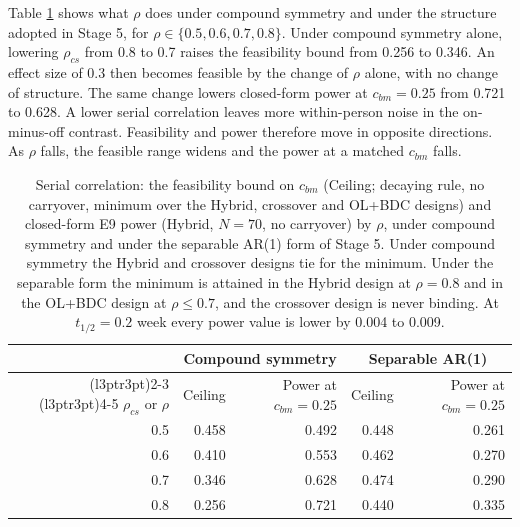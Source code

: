 \documentclass[
  11pt,
]{article}
\begin{document}
Table \ref{tab:rhostage} shows what \(\rho\) does under compound
symmetry and under the structure adopted in Stage 5, for
\(\rho \in \{0.5, 0.6, 0.7, 0.8\}\). Under compound symmetry alone,
lowering \(\rho_{cs}\) from 0.8 to 0.7 raises the feasibility bound from
0.256 to 0.346. An effect size of 0.3 then becomes feasible by the
change of \(\rho\) alone, with no change of structure. The same
change lowers closed-form power at \(c_{bm} = 0.25\) from 0.721 to
0.628. A lower serial correlation leaves more within-person noise in
the on-minus-off contrast. Feasibility and power therefore move in
opposite directions. As \(\rho\) falls, the feasible range widens and
the power at a matched \(c_{bm}\) falls.

\begin{table}

\caption{\label{tab:rhostage}Serial correlation: the feasibility bound on $c_{bm}$ (Ceiling; decaying rule, no carryover, minimum over the Hybrid, crossover and OL+BDC designs) and closed-form E9 power (Hybrid, $N = 70$, no carryover) by $\rho$, under compound symmetry and under the separable AR(1) form of Stage 5. Under compound symmetry the Hybrid and crossover designs tie for the minimum. Under the separable form the minimum is attained in the Hybrid design at $\rho = 0.8$ and in the OL+BDC design at $\rho \le 0.7$, and the crossover design is never binding. At $t_{1/2} = 0.2$ week every power value is lower by 0.004 to 0.009.}
\centering
\begin{tabular}[t]{rrrrr}
\toprule
\multicolumn{1}{c}{ } & \multicolumn{2}{c}{Compound symmetry} & \multicolumn{2}{c}{Separable AR(1)} \\
\cmidrule(l{3pt}r{3pt}){2-3} \cmidrule(l{3pt}r{3pt}){4-5}
$\rho_{cs}$ or $\rho$ & Ceiling & Power at $c_{bm} = 0.25$ & Ceiling & Power at $c_{bm} = 0.25$\\
\midrule
0.5 & 0.458 & 0.492 & 0.448 & 0.261\\
0.6 & 0.410 & 0.553 & 0.462 & 0.270\\
0.7 & 0.346 & 0.628 & 0.474 & 0.290\\
0.8 & 0.256 & 0.721 & 0.440 & 0.335\\
\bottomrule
\end{tabular}
\end{table}
\end{document}
